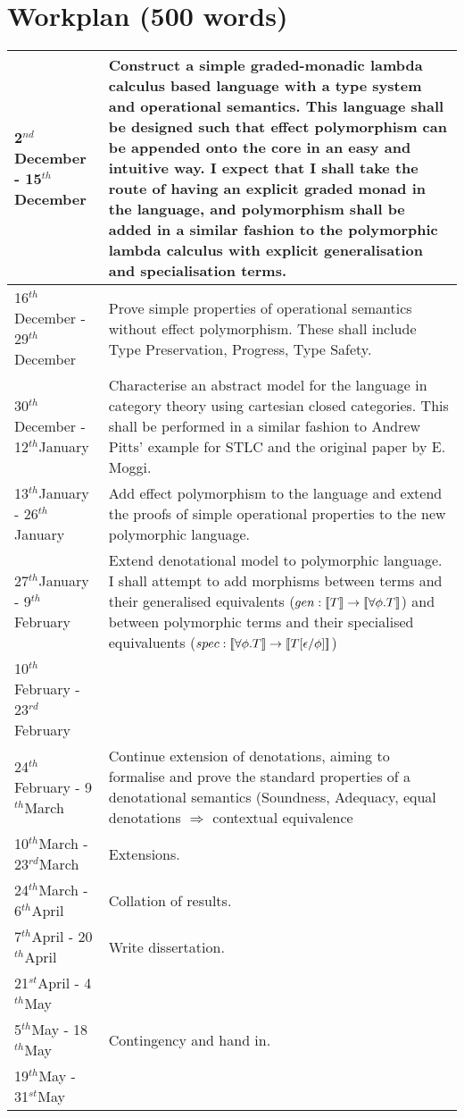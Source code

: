 \documentclass[11pt]{article}
\newcommand{\deno}[1]{{\bf [\![}#1{\bf ]\!]}}
\newcommand{\st}{$^{st}$}
\renewcommand{\th}{$^{th}$}
\newcommand{\nd}{$^{nd}$}
\newcommand{\rd}{$^{rd}$}
\begin{document}
\section{Workplan (500 words)}

\begin{tabular}{|p{6cm}||p{10cm}|}
\hline
	2\nd December - 15\th December & Construct a simple graded-monadic lambda calculus based language with a type system and operational semantics. This language shall be designed such that effect polymorphism can be appended onto the core in an easy and intuitive way. I expect that I shall take the route of having an explicit graded monad in the language, and polymorphism shall be added in a similar fashion to the polymorphic lambda calculus with explicit generalisation and specialisation terms.\\\hline
	16\th December - 29\th December & Prove simple properties of operational semantics without effect polymorphism. These shall include Type Preservation, Progress, Type Safety.\\\hline
	30\th December - 12\th January & Characterise an abstract model for the language in category theory using cartesian closed categories. This shall be performed in a similar fashion to Andrew Pitts' example for STLC and the original paper by E. Moggi.  \\\hline
	13\th January - 26\th January &  Add effect polymorphism to the language and extend the proofs of simple operational properties to the new polymorphic language. \\\hline
	27\th January - 9\th February &  Extend denotational model to polymorphic language. I shall attempt to add morphisms between terms and their generalised equivalents ($gen: \deno{T} \rightarrow \deno{\forall \phi. T} $) and between polymorphic terms and their specialised equivaluents 
	($spec: \deno{\forall \phi. T} \rightarrow \deno{T[ \epsilon / \phi ]} $)
	\\\cline{1-1}
	10\th February - 23\rd February &  \\\hline
	24\th February - 9\th March & Continue extension of denotations, aiming to formalise and prove the standard properties of a denotational semantics (Soundness, Adequacy, equal denotations $\Rightarrow$ contextual equivalence \\\hline
	10\th March - 23\rd March & Extensions. \\\hline
	24\th March - 6\th April & Collation of results. \\\hline
	7\th April - 20\th April & Write dissertation. \\\cline{1-1}
	21\st April - 4\th May &\\\hline
	5\th May - 18\th May & Contingency and hand in.\\\cline{1-1}
	19\th May - 31\st May & \\
\hline
\end{tabular}

\newpage
\appendix
\end{document}
